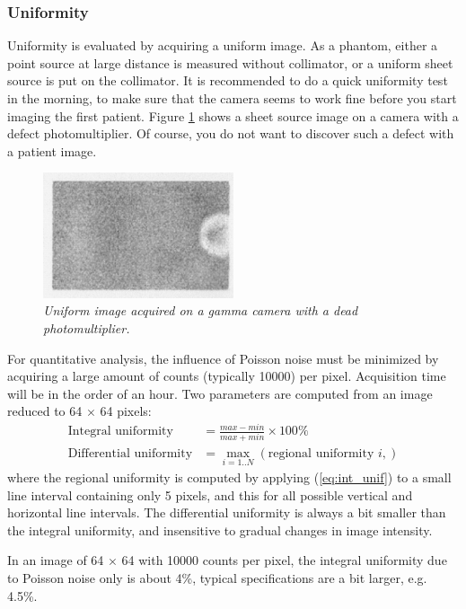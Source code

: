 \documentclass[11pt,oneside]{book}
\begin{document}
\subsubsection{Uniformity}
Uniformity is evaluated by acquiring a uniform image. As a phantom, either
a point source at large distance is measured without collimator, or a
uniform sheet source is put on the collimator. It is recommended to do a quick
uniformity test in the morning, to make sure that the camera seems to work
fine before you start imaging the first patient. Figure \ref{fig:qc_pmt} shows
a sheet source image on a camera with a defect photomultiplier. Of course, you
do not want to discover such a defect with a patient image.
%
\begin{figure}[tb]
\centering
\includegraphics[width=0.5\textwidth]{figs/fig_qc_pmt.pdf}
\caption{\label{fig:qc_pmt} \emph{Uniform image acquired on a gamma camera
with a dead photomultiplier.}}
\end{figure}

For quantitative analysis, the influence of Poisson noise must be minimized by
acquiring a large amount of counts (typically 10000) per pixel. Acquisition
time will be in the order of an hour. Two parameters are computed from an
image reduced to 64 $\times$ 64 pixels:
\begin{align}
 \mbox{Integral uniformity} &= \frac{max - min}{max + min} \times 100 \%
      \label{eq:int_unif}\\
 \mbox{Differential uniformity} &= \max_{i=1..N} \left( \mbox{regional
 uniformity $i$}, \right)
\end{align}
where the regional uniformity is computed by applying (\ref{eq:int_unif}) to a
small line interval containing only 5 pixels, and this for all possible
vertical and horizontal line intervals. The differential uniformity is always
a bit smaller than the integral uniformity, and insensitive to gradual changes
in image intensity.

In an image of 64 $\times$ 64 with 10000 counts per pixel, the integral
uniformity due to Poisson noise only is about 4\%, typical specifications are
a bit larger, e.g. 4.5\%.
\end{document}

